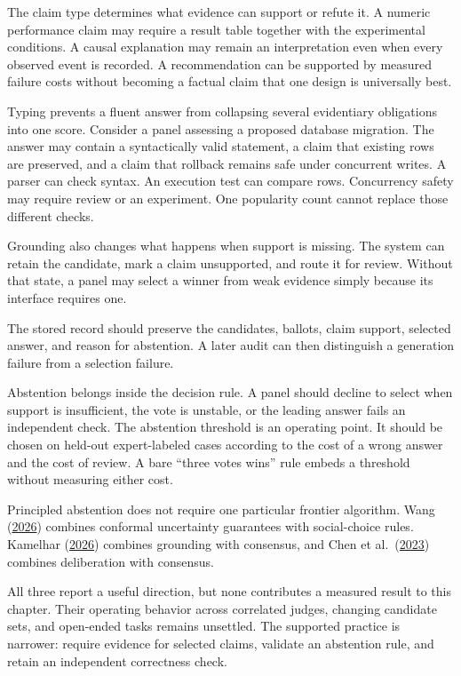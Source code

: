 The claim type determines what evidence can support or refute it. A numeric performance claim may require a result table together with the experimental conditions. A causal explanation may remain an interpretation even when every observed event is recorded. A recommendation can be supported by measured failure costs without becoming a factual claim that one design is universally best.

Typing prevents a fluent answer from collapsing several evidentiary obligations into one score. Consider a panel assessing a proposed database migration. The answer may contain a syntactically valid statement, a claim that existing rows are preserved, and a claim that rollback remains safe under concurrent writes. A parser can check syntax. An execution test can compare rows. Concurrency safety may require review or an experiment. One popularity count cannot replace those different checks.

Grounding also changes what happens when support is missing. The system can retain the candidate, mark a claim unsupported, and route it for review. Without that state, a panel may select a winner from weak evidence simply because its interface requires one.

The stored record should preserve the candidates, ballots, claim support, selected answer, and reason for abstention. A later audit can then distinguish a generation failure from a selection failure.

Abstention belongs inside the decision rule. A panel should decline to select when support is insufficient, the vote is unstable, or the leading answer fails an independent check. The abstention threshold is an operating point. It should be chosen on held-out expert-labeled cases according to the cost of a wrong answer and the cost of review. A bare ``three votes wins'' rule embeds a threshold without measuring either cost.

Principled abstention does not require one particular frontier algorithm. Wang (\href{https://arxiv.org/abs/2604.07667}{2026}) combines conformal uncertainty guarantees with social-choice rules. Kamelhar (\href{https://arxiv.org/abs/2604.23366}{2026}) combines grounding with consensus, and Chen et al.~(\href{https://arxiv.org/abs/2309.13007}{2023}) combines deliberation with consensus.

All three report a useful direction, but none contributes a measured result to this chapter. Their operating behavior across correlated judges, changing candidate sets, and open-ended tasks remains unsettled. The supported practice is narrower: require evidence for selected claims, validate an abstention rule, and retain an independent correctness check.


